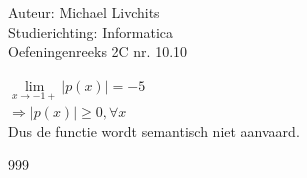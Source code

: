 \documentclass[a4paper]{article}
\begin{document}
  
\noindent \large Auteur: Michael Livchits \\
\noindent \large Studierichting: Informatica\\
\noindent \large Oefeningenreeks 2C nr. 10.10\\

\medskip

\normalsize

$ \lim\limits_{x\rightarrow -1+}|p(x)| = -5$\\

$\Rightarrow |p(x)| \ge 0, \forall x $\\

Dus de functie wordt semantisch niet aanvaard.

\begin{thebibliography}{999}
\end{thebibliography}
\end{document}
